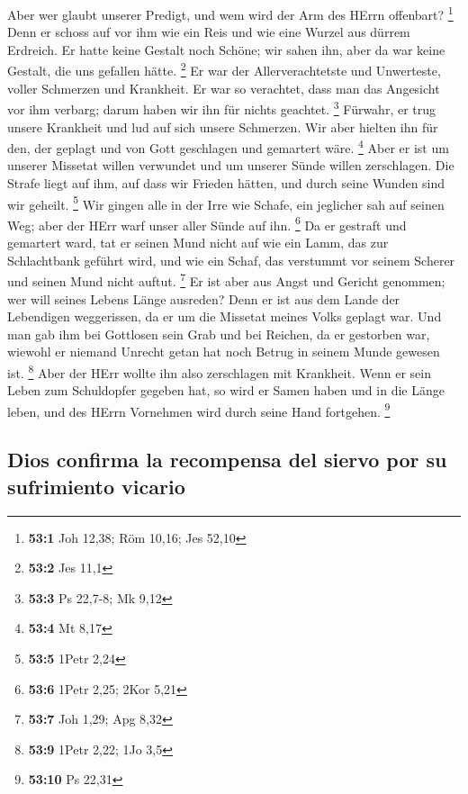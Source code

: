  Aber wer glaubt unserer Predigt, und wem wird der Arm des
HErrn offenbart? \footnote{\textbf{53:1} Joh 12,38; Röm 10,16; Jes 52,10}
 Denn er schoss auf vor ihm wie ein Reis und wie eine
Wurzel aus dürrem Erdreich. Er hatte keine Gestalt noch Schöne; wir
sahen ihn, aber da war keine Gestalt, die uns gefallen hätte.
\footnote{\textbf{53:2} Jes 11,1}  Er war der
Allerverachtetste und Unwerteste, voller Schmerzen und Krankheit. Er war
so verachtet, dass man das Angesicht vor ihm verbarg; darum haben wir
ihn für nichts geachtet. \footnote{\textbf{53:3} Ps 22,7-8; Mk 9,12}
 Fürwahr, er trug unsere Krankheit und lud auf sich unsere
Schmerzen. Wir aber hielten ihn für den, der geplagt und von Gott
geschlagen und gemartert wäre. \footnote{\textbf{53:4} Mt 8,17}
 Aber er ist um unserer Missetat willen verwundet und um
unserer Sünde willen zerschlagen. Die Strafe liegt auf ihm, auf dass wir
Frieden hätten, und durch seine Wunden sind wir geheilt. \footnote{\textbf{53:5}
  1Petr 2,24}  Wir gingen alle in der Irre wie Schafe, ein
jeglicher sah auf seinen Weg; aber der HErr warf unser aller Sünde auf
ihn. \footnote{\textbf{53:6} 1Petr 2,25; 2Kor 5,21}  Da er
gestraft und gemartert ward, tat er seinen Mund nicht auf wie ein Lamm,
das zur Schlachtbank geführt wird, und wie ein Schaf, das verstummt vor
seinem Scherer und seinen Mund nicht auftut. \footnote{\textbf{53:7} Joh
  1,29; Apg 8,32}  Er ist aber aus Angst und Gericht
genommen; wer will seines Lebens Länge ausreden? Denn er ist aus dem
Lande der Lebendigen weggerissen, da er um die Missetat meines Volks
geplagt war.  Und man gab ihm bei Gottlosen sein Grab und
bei Reichen, da er gestorben war, wiewohl er niemand Unrecht getan hat
noch Betrug in seinem Munde gewesen ist. \footnote{\textbf{53:9} 1Petr
  2,22; 1Jo 3,5}  Aber der HErr wollte ihn also
zerschlagen mit Krankheit. Wenn er sein Leben zum Schuldopfer gegeben
hat, so wird er Samen haben und in die Länge leben, und des HErrn
Vornehmen wird durch seine Hand fortgehen. \footnote{\textbf{53:10} Ps
  22,31}

\hypertarget{dios-confirma-la-recompensa-del-siervo-por-su-sufrimiento-vicario}{%
\subsection{Dios confirma la recompensa del siervo por su sufrimiento
vicario}\label{dios-confirma-la-recompensa-del-siervo-por-su-sufrimiento-vicario}}

